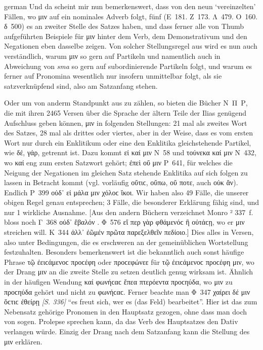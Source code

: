 \begin{otherlanguage*}{german}
\largerpage
Und da scheint mir nun bemerkenswert, dass von den neun ‘vereinzelten’ Fällen, wo μιν auf ein nominales Adverb folgt, fünf (Ε~181. Ζ~173. Λ~479. Ο~160. δ~500) es an zweiter Stelle des Satzes haben, und dass ferner alle von Thumb aufgeführten Beispiele für μιν hinter dem Verb, dem Demonstrativum und den Negationen eben dasselbe zeigen. Von solcher Stellungsregel aus wird es nun auch verständlich, warum μιν so gern auf Partikeln und namentlich auch in Abweichung von \emph{sma} so gern auf subordinierende Partikeln folgt, und warum es ferner auf Pronomina wesentlich nur insofern unmittelbar folgt, als sie satzverknüpfend sind, also am Satzanfang stehen.

Oder um von anderm Standpunkt aus zu zählen, so bieten die Bücher Ν~Π~Ρ, die mit ihren 2465 Versen über die Sprache der ältern Teile der Ilias genügend Aufschluss geben können, μιν in folgenden Stellungen: 21 mal als zweites Wort des Satzes, 28 mal als drittes oder viertes, aber in der Weise, dass es vom ersten Wort nur durch ein Enklitikum oder eine den Enklitika gleichstehende Partikel, wie δέ, γάρ, getrennt ist. Dazu kommt εἰ καί μιν Ν~58 und τούνεκα καί μιν Ν~432, wo καί eng zum ersten Satzwort gehört; ἐπεὶ οὔ μιν Ρ~641, für welches die Neigung der Negationen im gleichen Satz stehende Enklitika auf sich folgen zu lassen in Betracht kommt (vgl. vorläufig οὔτιϲ, οὔπω, οὔ ποτε, auch οὐκ ἄν). Endlich Ρ~399 οὐδ᾽ εἰ μάλα μιν χόλοϲ ἵκοι. Wir haben also 49 Fälle, die unserer obigen Regel genau entsprechen; 3 Fälle, die besonderer Erklärung fähig sind, und nur 1 wirkliche Ausnahme. [Aus den andern Büchern verzeichnet Monro ² 337~f. bloss noch Γ~368 οὐδ᾽ ἔβαλόν . Φ~576 εἴ περ γὰρ φθάμενόϲ  ἢ οὐτάϲῃ, wo er μιν streichen will. Κ~344 ἀλλ᾽ ἐῶμέν  πρῶτα παρεξελθεῖν πεδίοιο.] Dies alles in Versen, also unter Bedingungen, die es erschweren an der gemeinüblichen Wortstellung festzuhalten. Besonders bemerkenswert ist die bekanntlich auch sonst häufige Phrase τῷ  ἐειϲάμενοϲ προϲέφη oder προϲεφώνεε für τῷ ἐειϲάμενοϲ προϲέφη μιν, wo der Drang μιν an die zweite Stelle zu setzen deutlich genug wirksam ist. Ähnlich in der häufigen Wendung καί  φωνήϲαϲ ἔπεα πτερόεντα προϲηύδα, wo μιν zu προϲηύδα gehört und nicht zu φωνήϲαϲ. Ferner beachte man Φ~347 χαίρει δέ μιν ὅϲτιϲ ἐθείρῃ \hypertarget{p336}{\emph{[S. 336]}}\label{p336} “es freut sich, wer es (das Feld) bearbeitet”. Hier ist das zum Nebensatz gehörige Pronomen in den Hauptsatz gezogen, ohne dass man doch von sogen. Prolepse sprechen kann, da das Verb des Hauptsatzes den Dativ verlangen würde. Einzig der Drang nach dem Satzanfang kann die Stellung des μιν erklären.


\end{otherlanguage*}
